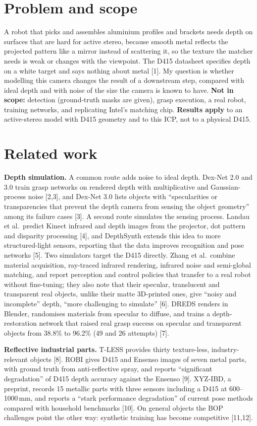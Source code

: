 \documentclass[10pt,a4paper]{article}
\newcommand{\para}[1]{\textbf{#1}\enspace}
\newcommand{\cte}[1]{[#1]}
\begin{document}
\section{Problem and scope}
A robot that picks and assembles aluminium profiles and brackets needs depth on surfaces that are hard for active stereo, because smooth metal reflects the projected pattern like a mirror instead of scattering it, so the texture the matcher needs is weak or changes with the viewpoint. The D415 datasheet specifies depth on a white target and says nothing about metal \cte{1}. My question is whether modelling this camera changes the result of a downstream step, compared with ideal depth and with noise of the size the camera is known to have.
\textbf{Not in scope:} detection (ground-truth masks are given), grasp execution, a real robot, training networks, and replicating Intel's matching chip. \textbf{Results apply} to an active-stereo model with D415 geometry and to this ICP, not to a physical D415.

\section{Related work}
\para{Depth simulation.} A common route adds noise to ideal depth. Dex-Net 2.0 and 3.0 train grasp networks on rendered depth with multiplicative and Gaussian-process noise \cte{2,3}, and Dex-Net 3.0 lists objects with ``specularities or transparencies that prevent the depth camera from sensing the object geometry'' among its failure cases \cte{3}. A second route simulates the sensing process. Landau et al.\ predict Kinect infrared and depth images from the projector, dot pattern and disparity processing \cte{4}, and DepthSynth extends this idea to more structured-light sensors, reporting that the data improves recognition and pose networks \cte{5}. Two simulators target the D415 directly. Zhang et al.\ combine material acquisition, ray-traced infrared rendering, infrared noise and semi-global matching, and report perception and control policies that transfer to a real robot without fine-tuning; they also note that their specular, translucent and transparent real objects, unlike their matte 3D-printed ones, give ``noisy and incomplete'' depth, ``more challenging to simulate'' \cte{6}. DREDS renders in Blender, randomises materials from specular to diffuse, and trains a depth-restoration network that raised real grasp success on specular and transparent objects from 38.8\% to 96.2\% (49 and 26 attempts) \cte{7}.

\para{Reflective industrial parts.} T-LESS provides thirty texture-less, industry-relevant objects \cte{8}. ROBI gives D415 and Ensenso images of seven metal parts, with ground truth from anti-reflective spray, and reports ``significant degradation'' of D415 depth accuracy against the Ensenso \cte{9}. XYZ-IBD, a preprint, records 15 metallic parts with three sensors including a D415 at 600--1000\,mm, and reports a ``stark performance degradation'' of current pose methods compared with household benchmarks \cte{10}. On general objects the BOP challenges point the other way: synthetic training has become competitive \cte{11,12}.
\end{document}
